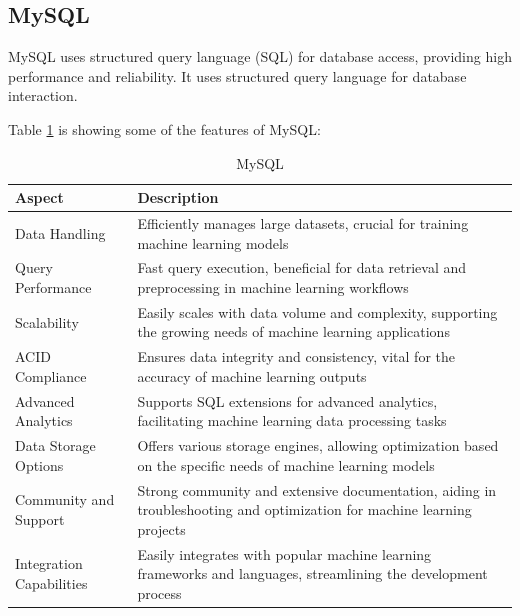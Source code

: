 \subsection{MySQL}
MySQL uses structured query language (SQL) for database access, providing high performance and reliability. It uses structured query language for database interaction.


Table \ref{tab:mysql} is showing some of the features of MySQL\cite{mysql}:

\begin{table}[H]
    \centering
    \begin{tabularx}{\textwidth}{|l|X|}
        \hline
        \textbf{Aspect}          & \textbf{Description}                                                                                                   \\
        \hline
        Data Handling            & Efficiently manages large datasets, crucial for training machine learning models                                       \\
        \hline
        Query Performance        & Fast query execution, beneficial for data retrieval and preprocessing in machine learning workflows                    \\
        \hline
        Scalability              & Easily scales with data volume and complexity, supporting the growing needs of machine learning applications           \\
        \hline
        ACID Compliance          & Ensures data integrity and consistency, vital for the accuracy of machine learning outputs                             \\
        \hline
        Advanced Analytics       & Supports SQL extensions for advanced analytics, facilitating machine learning data processing tasks                    \\
        \hline
        Data Storage Options     & Offers various storage engines, allowing optimization based on the specific needs of machine learning models           \\
        \hline
        Community and Support    & Strong community and extensive documentation, aiding in troubleshooting and optimization for machine learning projects \\
        \hline
        Integration Capabilities & Easily integrates with popular machine learning frameworks and languages, streamlining the development process         \\
        \hline
    \end{tabularx}
    \label{tab:mysql}
    \caption{MySQL}
\end{table}

